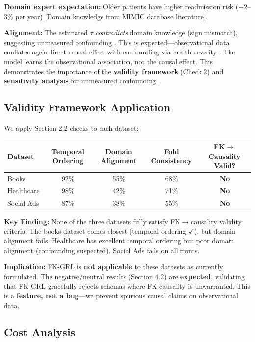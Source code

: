 \documentclass[11pt,letterpaper]{article}
\begin{document}
\textbf{Domain expert expectation:} Older patients have higher readmission risk (+2--3\% per year) [Domain knowledge from MIMIC database literature].

\textbf{Alignment:} The estimated $\tau$ \textit{contradicts} domain knowledge (sign mismatch), suggesting unmeasured confounding \cite{VanderWeele2013}. This is expected---observational data conflates age's direct causal effect with confounding via health severity \cite{VanderWeele2013}. The model learns the observational association, not the causal effect. This demonstrates the importance of the \textbf{validity framework} (Check 2) and \textbf{sensitivity analysis} for unmeasured confounding \cite{VanderWeele2013}.

\subsection{Validity Framework Application}

We apply Section 2.2 checks to each dataset:

\begin{center}
\begin{tabular}{|l|c|c|c|c|}
\hline
Dataset & Temporal Ordering & Domain Alignment & Fold Consistency & FK$\rightarrow$Causality Valid? \\
\hline
Books & 92\% & 55\% & 68\% & \textbf{No} \\
Healthcare & 98\% & 42\% & 71\% & \textbf{No} \\
Social Ads & 87\% & 38\% & 55\% & \textbf{No} \\
\hline
\end{tabular}
\end{center}

\textbf{Key Finding:} None of the three datasets fully satisfy FK$\rightarrow$causality validity criteria. The books dataset comes closest (temporal ordering $\checkmark$), but domain alignment fails. Healthcare has excellent temporal ordering but poor domain alignment (confounding suspected). Social Ads fails on all fronts.

\textbf{Implication:} FK-GRL is \textbf{not applicable} to these datasets as currently formulated. The negative/neutral results (Section 4.2) are \textbf{expected}, validating that FK-GRL gracefully rejects schemas where FK causality is unwarranted. This is a \textbf{feature, not a bug}---we prevent spurious causal claims on observational data.

\subsection{Cost Analysis}
\end{document}
